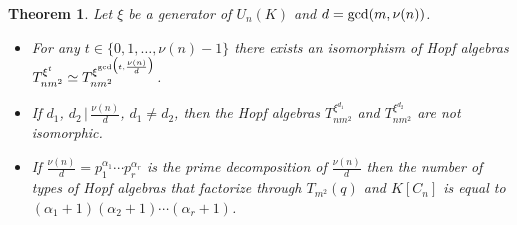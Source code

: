 \documentclass[pdftex]{sigma}
\numberwithin{equation}{section}
\newtheorem{Theorem}{Theorem}[section]
\begin{document}
\begin{Theorem}\label{counting}
Let $\xi$ be a generator of $U_n (K)$ and $d = {\rm gcd}(m,\nu (n))$.
\begin{itemize}\itemsep=0pt
\item[$1)$] For any $t \in \{0, 1,\dots, \nu(n) - 1\}$ there exists an isomorphism of Hopf algebras $T_{nm^{2}}^ {\xi^{t}} \simeq T_{nm^{2}}^ {\xi^{{\rm gcd}\big(t, \frac{\nu(n)}{d}\big)}}$.
\item[$2)$] If $d_{1}$, $d_{2} \,|\, \frac{\nu(n)}{d}$, $d_{1} \neq d_{2}$, then the Hopf algebras $T_{nm^{2}}^ {\xi^{d_{1}}}$ and $T_{nm^{2}}^
{\xi^{d_{2}}}$ are not isomorphic.
\item[$3)$] If $ \frac{\nu(n)}{d} = p_1^{\alpha_1} \cdots p_r^{\alpha_r}$ is the prime decomposition of $ \frac{\nu(n)}{d}$ then the number of types of Hopf algebras that factorize through $T_{m^{2}}(q)$ and $K[C_n]$ is equal to $(\alpha_1 + 1)(\alpha_2 + 1) \cdots (\alpha_r + 1)$.
\end{itemize}
\end{Theorem}
\end{document}
